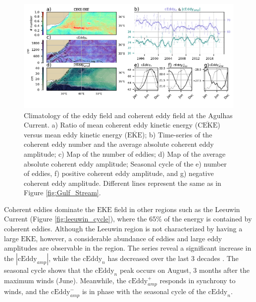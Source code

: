 \documentclass[draft,linenumbers]{agujournal2019}
\newcommand{\MEKE}{\overline{\textrm{EKE}}}
\newcommand{\EKE}{\textrm{EKE}}
\newcommand{\MCEKE}{\overline{\textrm{CEKE}}}
\newcommand{\cEddy}{\textrm{cEddy}}
\begin{document}
	\begin{figure}
	    \centering
	    \includegraphics[width=1\textwidth]{figures/regional_ratios_and_stats_V3_2.pdf}
	    \caption{Climatology of the eddy field and coherent eddy field at the Agulhas Current. a) Ratio of mean coherent eddy kinetic energy ($\MCEKE$) versus mean eddy kinetic energy ($\MEKE$); b) Time-series of the coherent eddy number and the average absolute coherent eddy amplitude; c) Map of the number of eddies; d) Map of the average absolute coherent eddy amplitude; Seasonal cycle of the e) number of eddies, f) positive coherent eddy amplitude, and g) negative coherent eddy amplitude. Different lines represent the same as in Figure \ref{fig:Gulf_Stream}.}
	    \label{fig:Agulhas}
	\end{figure}


	Coherent eddies dominate the $\EKE$ field in other regions such as the Leeuwin Current (Figure \ref{fig:leeuwin_cycle}), where the 65\% of the energy is contained by coherent eddies. 
	Although the Leeuwin region is not characterized by having a large $\EKE$, however, a considerable abundance of eddies and large eddy amplitudes are observable in the region. 
	The series reveal a significant increase in the $|\cEddy_{amp}|$, while the $\cEddy_{n}$ has decreased over the last 3 decades \citep{}. The seasonal cycle shows that the $\cEddy_{n}$ peak occurs on August, 3 months after the maximum winds (June). Meanwhile, the $\cEddy_{amp}^+$ responds in synchrony to winds, and the $\cEddy_{amp}^-$ is in phase with the seasonal cycle of the $\cEddy_{n}$. 
 		
\end{document}
